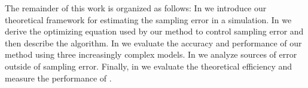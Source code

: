 The remainder of this work is organized as follows: In  we introduce our theoretical framework for estimating the sampling error in a  simulation. In  we derive the optimizing equation used by our method to control sampling error and then describe the  algorithm. In  we evaluate the accuracy and performance of our method using three increasingly complex models. In  we analyze sources of error outside of sampling error. Finally, in  we evaluate the theoretical efficiency and measure the performance of .


%
%
%
